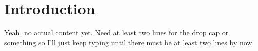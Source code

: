 \section{Introduction}

  Yeah, no actual content yet.  Need at least two lines for the drop cap or
  something so I'll just keep typing until there must be at least two lines by
  now.
